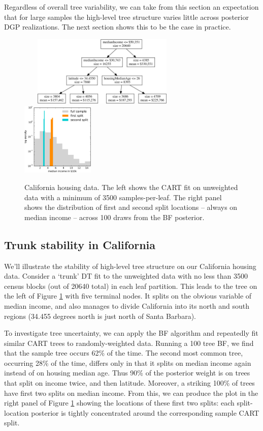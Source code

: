 \documentclass{article}
\begin{document}
Regardless of overall tree variability, we can take from this section an expectation that for large samples the
high-level tree structure varies little across posterior DGP realizations.
The next section shows this to be the case in practice.




\begin{figure}
~~~
\includegraphics[width=0.6\textwidth]{../graphs/ca_trunk}
~~~~~~
\includegraphics[width=0.31\textwidth]{../graphs/ca_splits}
\caption{\label{calistable} California housing data.  The left shows the CART fit  on unweighted data with a minimum of 3500 samples-per-leaf. The right panel shows the distribution of first and second split locations -- always on median income  -- across 100 draws from the BF posterior. }
\end{figure}


\subsection{Trunk stability in California}\label{stability-in-california}


We'll illustrate the stability of high-level tree structure on our California
housing data. Consider a `trunk' DT fit to the unweighted data with no less
than 3500 census blocks (out of 20640 total) in each leaf partition.  This
leads to the tree on the left of Figure \ref{calistable} with five terminal
nodes. It splits on the obvious variable of median income, and also manages to
divide California into its north and south regions (34.455 degrees north is
just north of Santa Barbara).

To investigate tree uncertainty, we can apply the BF algorithm and repeatedly fit similar CART trees to randomly-weighted data.  Running a 100 tree BF, we find that the sample tree occurs 62\% of the time.  The second most common tree, occurring 28\% of the time, differs only in that it splits on median income again instead of on housing median age.  Thus 90\% of the posterior weight is on trees that split on income twice, and then latitude.  Moreover, a striking 100\% of trees have first two splits on median income.  From this, we can produce the plot in the right panel of Figure \ref{calistable} showing the locations of these first two splits: each split-location posterior is tightly concentrated around the corresponding sample CART split.
\end{document}
